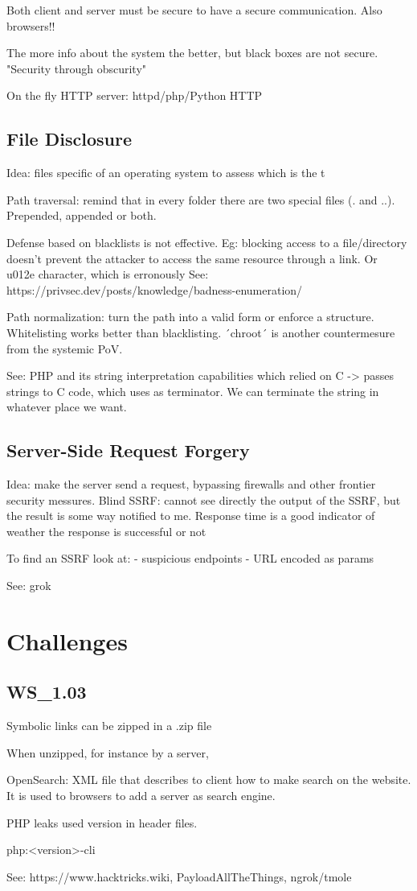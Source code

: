 Both client and server must be secure to have a secure communication. Also browsers!!

The more info about the system the better, but black boxes are not secure. "Security through obscurity"


On the fly HTTP server: httpd/php/Python HTTP

\subsection{File Disclosure}
Idea: files specific of an operating system to assess which is the t

Path traversal: remind that in every folder there are two special files (. and ..). Prepended, appended or both.

Defense based on blacklists is not effective. Eg: blocking access to a file/directory doesn't prevent the attacker to access the same resource through a link. Or \\u012e character, which is erronously 
See: https://privsec.dev/posts/knowledge/badness-enumeration/

Path normalization: turn the path into a valid form or enforce a structure. 
Whitelisting works better than blacklisting.
´chroot´ is another countermesure from the systemic PoV.

See: PHP and its string interpretation capabilities which relied on C -> passes strings to C code, which uses \0 as terminator. We can terminate the string in whatever place we want.

\subsection{Server-Side Request Forgery}
Idea: make the server send a request, bypassing firewalls and other frontier security messures.
Blind SSRF: cannot see directly the output of the SSRF, but the result is some way notified to me.
Response time is a good indicator of weather the response is successful or not

To find an SSRF look at:
 - suspicious endpoints
 - URL encoded as params


See: grok

\section{Challenges}
\subsection{WS_1.03}
Symbolic links can be zipped in a .zip file

When unzipped, for instance by a server, 

OpenSearch: XML file that describes to client how to make search on the website. It is used to browsers to add a server as search engine.

PHP leaks used version in header files.

php:<version>-cli

See: https://www.hacktricks.wiki, PayloadAllTheThings, ngrok/tmole